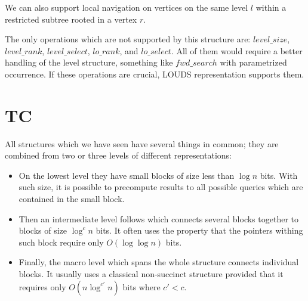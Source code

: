 \begin{algorithmic}
	\State {}
\EndFunction
\end{algorithmic}

We can also support local navigation on vertices on the same level $l$ within a restricted subtree rooted in a vertex $r$.

\begin{algorithmic}
	\State {}
\EndFunction
\end{algorithmic}

\begin{algorithmic}
	\State {}
\EndFunction
\end{algorithmic}

\begin{algorithmic}
	\State {}
\EndFunction
\end{algorithmic}

\begin{algorithmic}
	\State {}
\EndFunction
\end{algorithmic}

\bigskip

The only operations which are not supported by this structure are: $level\_size$, $level\_rank$, $level\_select$, $lo\_rank$, and $lo\_select$.
All of them would require a better handling of the level structure, something like $fwd\_search$ with parametrized occurrence.
If these operations are crucial, LOUDS representation supports them.

\section{TC}

All structures which we have seen have several things in common; they are combined from two or three levels of different representations:
\begin{itemize}
	\item On the lowest level they have small blocks of size less than $\log n$ bits.
	With such size, it is possible to precompute results to all possible queries which are contained in the small block.
	\item Then an intermediate level follows which connects several blocks together to blocks of size $\log^c n$ bits.
	It often uses the property that the pointers withing such block require only $O(\log \log n)$ bits.
	\item Finally, the macro level which spans the whole structure connects individual blocks.
	It usually uses a classical non-succinct structure provided that it requires only $O(n \log^{c'} n)$ bits where $c' < c$.
\end{itemize}

